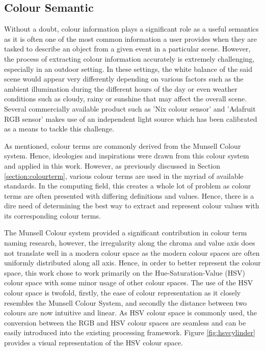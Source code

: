 \subsection{Colour Semantic}
\label{subsec:colorsemantics}

Without a doubt, colour information plays a significant role as a useful semantics as it is often one of the most common information a user provides when they are tasked to describe an object from a given event in a particular scene. However, the process of extracting colour information accurately is extremely challenging, especially in an outdoor setting. In these settings, the white balance of the said scene would appear very differently depending on various factors such as the ambient illumination during the different hours of the day or even weather conditions such as cloudy, rainy or sunshine that may affect the overall scene. Several commercially available product such as 'Nix colour sensor' \cite{nixsensorltd} and 'Adafruit RGB sensor' \cite{adafruit} makes use of an independent light source which has been calibrated as a means to tackle this challenge.

As mentioned, colour terms are commonly derived from the Munsell Colour system. Hence, ideologies and inspirations were drawn from this colour system and applied in this work. However, as previously discussed in Section \ref{section:colourterm}, various colour terms are used in the myriad of available standards. In the computing field, this creates a whole lot of problem as colour terms are often presented with differing definitions and values. Hence, there is a dire need of determining the best way to extract and represent colour values with its corresponding colour terms. 




The Munsell Colour system provided a significant contribution in colour term naming research, however, the irregularity along the chroma and value axis does not translate well in a modern colour space as the modern colour spaces are often uniformly distributed along all axis. Hence, in order to better represent the colour space, this work chose to work primarily on the Hue-Saturation-Value (HSV) colour space with some minor usage of other colour spaces. The use of the HSV colour space is twofold, firstly, the ease of colour representation as it closely resembles the Munsell Colour System, and secondly the distance between two colours are now intuitive and linear. As HSV colour space is commonly used, the conversion between the RGB and HSV colour spaces are seamless and can be easily introduced into the existing processing framework. Figure \ref{fig:hsvcylinder} provides a visual representation of the HSV colour space.

